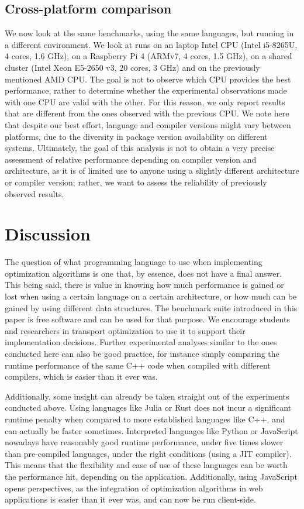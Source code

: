 \documentclass[11pt,a4paper,notitlepage]{article}
\begin{document}
\subsection{Cross-platform comparison}
We now look at the same benchmarks, using the same languages, but running
in a different environment. We look at runs on an laptop Intel CPU
(Intel i5-8265U, 4 cores, 1.6 GHz), on a Raspberry Pi 4 (ARMv7,
4 cores, 1.5 GHz), on a shared cluster (Intel Xeon E5-2650 v3, 20
cores, 3 GHz) and on the previously mentioned AMD CPU. The
goal is not to observe which CPU provides the best performance, rather
to determine whether the experimental observations made with one CPU
are valid with the other. For this reason, we only report results that
are different from the ones observed with the previous CPU.
We note here that despite our best effort, language and compiler
versions might vary between platforms, due to the diversity in
package version availability on different systems. Ultimately, the
goal of this analysis is not to obtain a very precise assessment of
relative performance depending on compiler version and architecture, as it
is of limited use to anyone using a slightly different architecture or
compiler version; rather, we want to assess the reliability of
previously observed results.

\section{Discussion}
The question of what programming language to use when implementing
optimization algorithms is one that, by essence, does not have a final
answer. This being said, there is value in knowing how much
performance is gained or lost when using a certain
language on a certain architecture, or how much can be
gained by using different data structures. The benchmark suite
introduced in this paper is free software and can be used for that
purpose. We encourage students and researchers in
transport optimization to use it to support their implementation
decisions. Further experimental analyses similar to the ones conducted
here can also be good practice, for instance simply comparing the
runtime performance of the same C++ code when compiled with different
compilers, which is easier than it ever was.

Additionally, some insight can already be taken straight out of the
experiments conducted above. Using languages like Julia or Rust
does not incur a significant runtime penalty when compared to more
established languages like C++, and can actually be faster
sometimes. Interpreted languages like Python or JavaScript nowadays
have reasonably good runtime performance, under five times slower than
pre-compiled languages, under the right conditions (using a JIT
compiler). This means that the flexibility and ease of use of these
languages can be worth the performance hit, depending on the
application. Additionally, using JavaScript opens perspectives, as the
integration of optimization algorithms in web applications is easier
than it ever was, and can now be run client-side.
\end{document}

